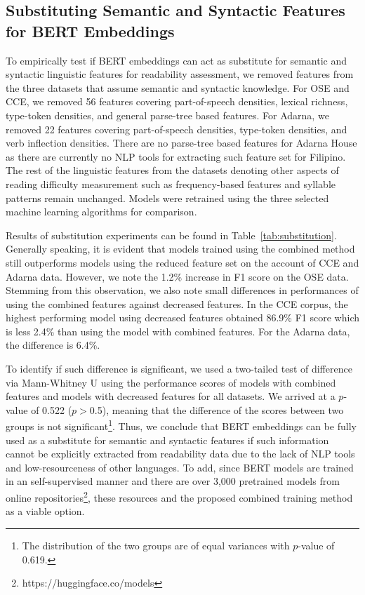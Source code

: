 \documentclass[11pt,a4paper]{article}
\begin{document}
\subsection{Substituting Semantic and Syntactic Features for BERT Embeddings}
To empirically test if BERT embeddings can act as substitute for semantic and syntactic linguistic features for readability assessment, we removed features from the three datasets that assume semantic and syntactic knowledge. For OSE and CCE, we removed 56 features covering part-of-speech densities, lexical richness, type-token densities, and general parse-tree based features. For Adarna, we removed 22 features covering part-of-speech densities, type-token densities, and verb inflection densities. There are no parse-tree based features for Adarna House as there are currently no NLP tools for extracting such feature set for Filipino. The rest of the linguistic features from the datasets denoting other aspects of reading difficulty measurement such as frequency-based features and syllable patterns remain unchanged. Models were retrained using the three selected machine learning algorithms for comparison.

Results of substitution experiments can be found in Table~\ref{tab:substitution}. Generally speaking, it is evident that models trained using the combined method still outperforms models using the reduced feature set on the account of CCE and Adarna data. However, we note the 1.2\% increase in F1 score on the OSE data. Stemming from this observation, we also note small differences in performances of using the combined features against decreased features. In the CCE corpus, the highest performing model using decreased features obtained 86.9\% F1 score which is less 2.4\% than using the model with combined features. For the Adarna data, the difference is 6.4\%.


To identify if such difference is significant, we used a two-tailed test of difference via Mann-Whitney U using the performance scores of models with combined features and models with decreased features for all datasets. We arrived at a $p$-value of 0.522 ($p>$0.5), meaning that the difference of the scores between two groups is not significant\footnote{The distribution of the two groups are of equal variances with $p$-value of 0.619.}. Thus, we conclude that BERT embeddings can be fully used as a substitute for semantic and syntactic features if such information cannot be explicitly extracted from readability data due to the lack of NLP tools and low-resourceness of other languages. To add, since BERT models are trained in an self-supervised manner and there are over 3,000 pretrained models from online repositories\footnote{https://huggingface.co/models}, these resources and the proposed combined training method as a viable option.
\end{document}
